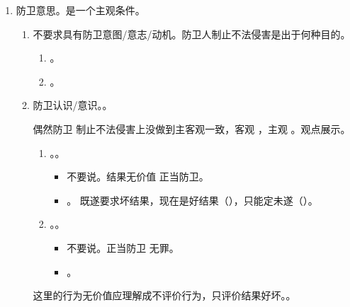 \begin{enumerate}
\begin{enumerate}
\begin{enumerate}
                \end{enumerate}
          \item 防卫意思。是一个主观条件。
                \begin{enumerate}
                  \item 不要求具有防卫意图/意志/动机。防卫人制止不法侵害是出于何种目的。
                        \begin{enumerate}
                          \item {}。
                          \item {}。
                        \end{enumerate}
                  \item 防卫认识/意识。。
                        \begin{kk}{偶然防卫}
                          制止不法侵害上没做到主客观一致，客观 \dui，主观 \cuo。观点展示。
                          \begin{enumerate}
                            \item {}。。
                                  \begin{itemize}
                                    \item 不要说。结果无价值 \yjt {}正当防卫。
                                    \item {}。
                                          既遂要求坏结果，现在是好结果（），只能定未遂（）。
                                  \end{itemize}
                            \item {}。。
                                  \begin{itemize}
                                    \item 不要说。正当防卫 \yjt 无罪。
                                    \item {}。
                                  \end{itemize}
                          \end{enumerate}
                          \tcblower
                          这里的行为无价值应理解成不评价行为，只评价结果好坏。。

\end{kk}
\end{enumerate}
\end{enumerate}
\end{enumerate}
